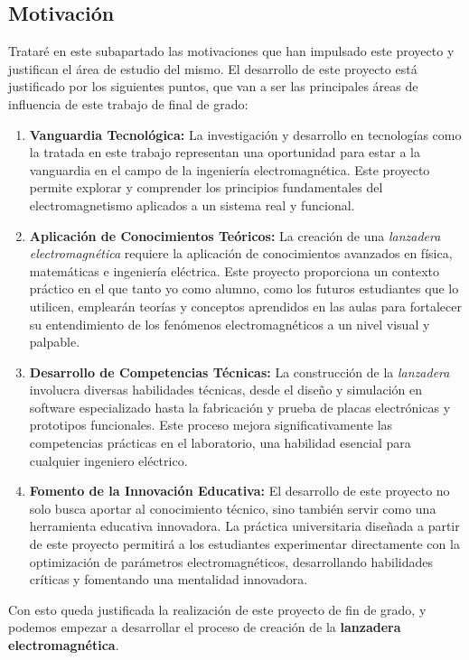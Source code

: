 \newpage
\subsection{Motivación}

Trataré en este subapartado las motivaciones que han impulsado este proyecto y justifican el área de estudio del mismo. El desarrollo de este proyecto está justificado por los siguientes puntos, que van a ser las principales áreas de influencia de este trabajo de final de grado:

\begin{enumerate}
    \item \textbf{Vanguardia Tecnológica:} La investigación y desarrollo en tecnologías como la tratada en este trabajo representan una oportunidad para estar a la vanguardia en el campo de la ingeniería electromagnética. Este proyecto permite explorar y comprender los principios fundamentales del electromagnetismo aplicados a un sistema real y funcional.
    \item \textbf{Aplicación de Conocimientos Teóricos:} La creación de una \textit{lanzadera electromagnética} requiere la aplicación de conocimientos avanzados en física, matemáticas e ingeniería eléctrica. Este proyecto proporciona un contexto práctico en el que tanto yo como alumno, como los futuros estudiantes que lo utilicen, emplearán teorías y conceptos aprendidos en las aulas para fortalecer su entendimiento de los fenómenos electromagnéticos a un nivel visual y palpable.
    \item \textbf{Desarrollo de Competencias Técnicas:} La construcción de la \textit{lanzadera} involucra diversas habilidades técnicas, desde el diseño y simulación en software especializado hasta la fabricación y prueba de placas electrónicas y prototipos funcionales. Este proceso mejora significativamente las competencias prácticas en el laboratorio, una habilidad esencial para cualquier ingeniero eléctrico.
    \item \textbf{Fomento de la Innovación Educativa:} El desarrollo de este proyecto no solo busca aportar al conocimiento técnico, sino también servir como una herramienta educativa innovadora. La práctica universitaria diseñada a partir de este proyecto permitirá a los estudiantes experimentar directamente con la optimización de parámetros electromagnéticos, desarrollando habilidades críticas y fomentando una mentalidad innovadora.
\end{enumerate}

Con esto queda justificada la realización de este proyecto de fin de grado, y podemos empezar a desarrollar el proceso de creación de la \textbf{lanzadera electromagnética}.